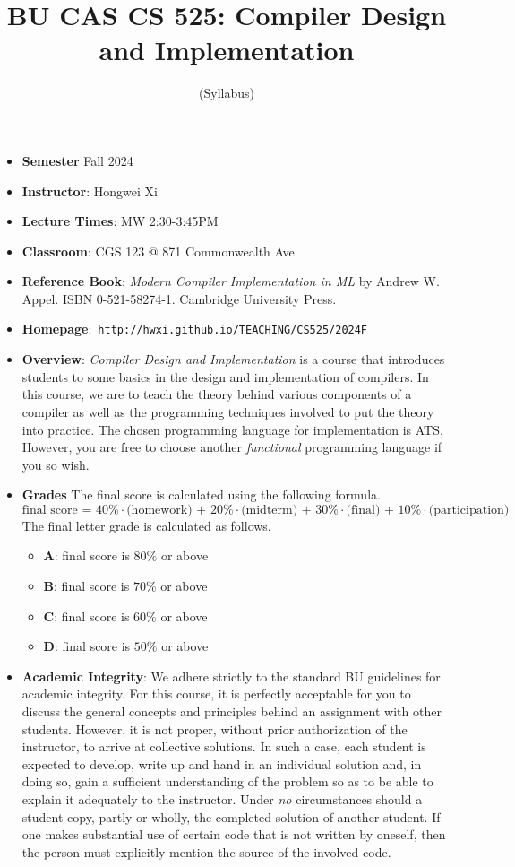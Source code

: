 \documentclass[11pt]{article}
\title{BU CAS CS 525: Compiler Design and Implementation}
\author{(Syllabus)}
\date{}
\begin{document}
\maketitle
\thispagestyle{empty}

\begin{itemize}
\item {\bf Semester} Fall 2024
\item {\bf Instructor}: Hongwei Xi
\item {\bf Lecture Times}: MW 2:30-3:45PM
\item {\bf Classroom}: CGS 123 @ 871 Commonwealth Ave
\item {\bf Reference Book}:\kern6pt
{\em Modern Compiler Implementation in ML} by Andrew W. Appel.  ISBN
0-521-58274-1. Cambridge University Press.
\item {\bf Homepage}:~{\tt http://hwxi.github.io/TEACHING/CS525/2024F}
\item {\bf Overview}:
{\em Compiler Design and Implementation} is a course that introduces
students to some basics in the design and implementation of compilers. In
this course, we are to teach the theory behind various components of a
compiler as well as the programming techniques involved to put the theory
into practice. The chosen programming language for implementation is
ATS. However, you are free to choose another {\em functional} programming
language if you so wish.

\item {\bf Grades}
The final score is calculated using the following formula.
\[\mbox{final score = 40\%$\cdot$(homework) + 20\%$\cdot$(midterm) + 30\%$\cdot$(final) + 10\%$\cdot$(participation)}\]
The final letter grade is calculated as follows.
\begin{itemize}
\item{\bf A}: final score is $80\%$ or above
\item{\bf B}: final score is $70\%$ or above
\item{\bf C}: final score is $60\%$ or above
\item{\bf D}: final score is $50\%$ or above
\end{itemize}

\item {\bf Academic Integrity}:
We adhere strictly to the standard BU guidelines for academic
integrity. For this course, it is perfectly acceptable for you to discuss
the general concepts and principles behind an assignment with other
students. However, it is not proper, without prior authorization of the
instructor, to arrive at collective solutions. In such a case, each student
is expected to develop, write up and hand in an individual solution and, in
doing so, gain a sufficient understanding of the problem so as to be able
to explain it adequately to the instructor.  Under {\em no} circumstances
should a student copy, partly or wholly, the completed solution of another
student. If one makes substantial use of certain code that is not written by
oneself, then the person must explicitly mention the source of the involved
code.

\end{itemize}
\end{document}
